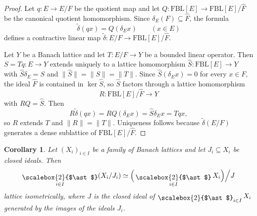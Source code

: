 \documentclass[12pt]{amsart}
\newcommand{\FBL}{\mathrm{FBL}}
\DeclareMathOperator*{\bigfree}{\raisebox{-0.6ex}{\scalebox{2}{$\ast$}}}
\theoremstyle{plain}
\newtheorem{corollary}[theorem]{Corollary}
\theoremstyle{definition}
\begin{document}
\begin{proof}
Let $q:E\to E/F$ be the quotient map and let $Q:\FBL[E]\to \FBL[E]/\widehat{F}$ be the canonical quotient homomorphism. Since $\delta_E(F)\subseteq \widehat{F}$, the formula
\[
\widetilde{\delta}(q x)=Q(\delta_E x)
\qquad (x\in E)
\]
defines a contractive linear map $\widetilde{\delta}:E/F\to \FBL[E]/\widehat{F}$.

Let $Y$ be a Banach lattice and let $T:E/F\to Y$ be a bounded linear operator. Then $S=Tq:E\to Y$ extends uniquely to a lattice homomorphism $\widehat{S}:\FBL[E]\to Y$ with $\widehat{S}\delta_E=S$ and $\|\widehat{S}\|=\|S\|=\|T\|$. Since $\widehat{S}(\delta_E x)=0$ for every $x\in F$, the ideal $\widehat{F}$ is contained in $\ker \widehat{S}$, so $\widehat{S}$ factors through a lattice homomorphism
\[
R:\FBL[E]/\widehat{F}\to Y
\]
with $RQ=\widehat{S}$. Then
\[
R\widetilde{\delta}(q x)=RQ(\delta_E x)=\widehat{S}\delta_E x=Tq x,
\]
so $R$ extends $T$ and $\|R\|=\|T\|$. Uniqueness follows because $\widetilde{\delta}(E/F)$ generates a dense sublattice of $\FBL[E]/\widehat{F}$.
\end{proof}

\begin{corollary}\label{cor:freeprod-quotients}
Let $(X_i)_{i\in I}$ be a family of Banach lattices and let $J_i\subseteq X_i$ be closed ideals. Then
\[
\bigfree_{i\in I}(X_i/J_i)\simeq
\Big(\bigfree_{i\in I}X_i\Big)\Big/ J
\]
lattice isometrically, where $J$ is the closed ideal of $\bigfree_{i\in I}X_i$ generated by the images of the ideals $J_i$.
\end{corollary}
\end{document}
